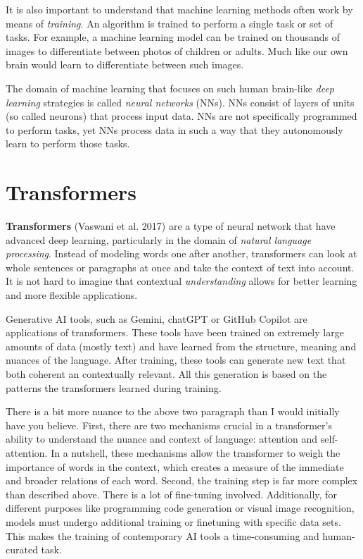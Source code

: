 \documentclass[
  letterpaper,
  DIV=11,
  numbers=noendperiod]{scrreprt}
\begin{document}
It is also important to understand that machine learning methods often
work by means of \emph{training}. An algorithm is trained to perform a
single task or set of tasks. For example, a machine learning model can
be trained on thousands of images to differentiate between photos of
children or adults. Much like our own brain would learn to differentiate
between such images.

The domain of machine learning that focuses on such human brain-like
\emph{deep learning} strategies is called \emph{neural networks} (NNs).
NNs consist of layers of units (so called neurons) that process input
data. NNs are not specifically programmed to perform tasks, yet NNs
process data in such a way that they autonomously learn to perform those
tasks.

\section{Transformers}\label{transformers}

\textbf{Transformers} (Vaswani et al. 2017) are a type of neural network
that have advanced deep learning, particularly in the domain of
\emph{natural language processing}. Instead of modeling words one after
another, transformers can look at whole sentences or paragraphs at once
and take the context of text into account. It is not hard to imagine
that contextual \emph{understanding} allows for better learning and more
flexible applications.

Generative AI tools, such as Gemini, chatGPT or GitHub Copilot are
applications of transformers. These tools have been trained on extremely
large amounts of data (mostly text) and have learned from the structure,
meaning and nuances of the language. After training, these tools can
generate new text that both coherent an contextually relevant. All this
generation is based on the patterns the transformers learned during
training.

There is a bit more nuance to the above two paragraph than I would
initially have you believe. First, there are two mechanisms crucial in a
transformer's ability to understand the nuance and context of language:
attention and self-attention. In a nutshell, these mechanisms allow the
transformer to weigh the importance of words in the context, which
creates a measure of the immediate and broader relations of each word.
Second, the training step is far more complex than described above.
There is a lot of fine-tuning involved. Additionally, for different
purposes like programming code generation or visual image recognition,
models must undergo additional training or finetuning with specific data
sets. This makes the training of contemporary AI tools a time-consuming
and human-curated task.
\end{document}
